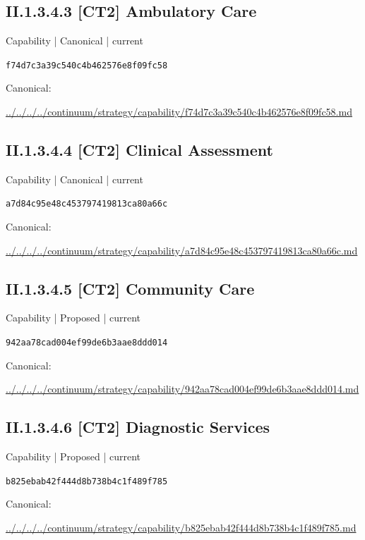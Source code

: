 \documentclass[10pt,a4paper]{article}
\begin{document}
\subsection*{II.1.3.4.3 [CT2] Ambulatory Care}
{\small Capability | Canonical | current}\par
\texttt{f74d7c3a39c540c4b462576e8f09fc58}\par
Canonical: \par
{\footnotesize\url{../../../../continuum/strategy/capability/f74d7c3a39c540c4b462576e8f09fc58.md}}\par
\subsection*{II.1.3.4.4 [CT2] Clinical Assessment}
{\small Capability | Canonical | current}\par
\texttt{a7d84c95e48c453797419813ca80a66c}\par
Canonical: \par
{\footnotesize\url{../../../../continuum/strategy/capability/a7d84c95e48c453797419813ca80a66c.md}}\par
\subsection*{II.1.3.4.5 [CT2] Community Care}
{\small Capability | Proposed | current}\par
\texttt{942aa78cad004ef99de6b3aae8ddd014}\par
Canonical: \par
{\footnotesize\url{../../../../continuum/strategy/capability/942aa78cad004ef99de6b3aae8ddd014.md}}\par
\subsection*{II.1.3.4.6 [CT2] Diagnostic Services}
{\small Capability | Proposed | current}\par
\texttt{b825ebab42f444d8b738b4c1f489f785}\par
Canonical: \par
{\footnotesize\url{../../../../continuum/strategy/capability/b825ebab42f444d8b738b4c1f489f785.md}}\par
\end{document}
